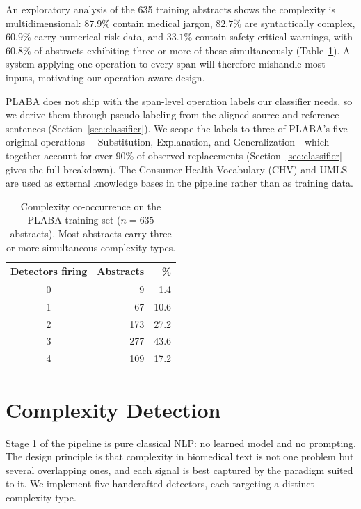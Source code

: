 \documentclass[11pt]{article}
\begin{document}
An exploratory analysis of the 635 training abstracts shows the
complexity is multidimensional: $87.9\%$ contain medical jargon,
$82.7\%$ are syntactically complex, $60.9\%$ carry numerical risk data,
and $33.1\%$ contain safety-critical warnings, with $60.8\%$ of abstracts
exhibiting three or more of these simultaneously
(Table~\ref{tab:cooccurrence}). A system applying one operation to every
span will therefore mishandle most inputs, motivating our operation-aware
design.

PLABA does not ship with the span-level operation labels our classifier needs,
so we derive them through pseudo-labeling from the aligned source and reference
sentences (Section~\ref{sec:classifier}). We scope the labels to three of
PLABA's five original operations \citep{attal2023plaba}---Substitution,
Explanation, and Generalization---which together account for over 90\% of
observed replacements \citep{ondov2025lessons} (Section~\ref{sec:classifier}
gives the full breakdown). The Consumer Health Vocabulary (CHV) and UMLS are
used as external knowledge bases in the pipeline rather than as training data.

\begin{table}[t]
  \centering
  \begin{tabular}{crr}
    \toprule
    \textbf{Detectors firing} & \textbf{Abstracts} & \textbf{\%} \\
    \midrule
    0 & 9 & 1.4 \\
    1 & 67 & 10.6 \\
    2 & 173 & 27.2 \\
    3 & 277 & 43.6 \\
    4 & 109 & 17.2 \\
    \bottomrule
  \end{tabular}
  \caption{Complexity co-occurrence on the PLABA training set ($n=635$
    abstracts). Most abstracts carry three or more simultaneous
    complexity types.}
  \label{tab:cooccurrence}
\end{table}

\section{Complexity Detection}
\label{sec:complexity}

Stage 1 of the pipeline is pure classical NLP: no learned model and no
prompting. The design principle is that complexity in biomedical text is not one
problem but several overlapping ones, and each signal is best captured by the
paradigm suited to it. We implement five handcrafted detectors, each targeting a
distinct complexity type.
\end{document}
